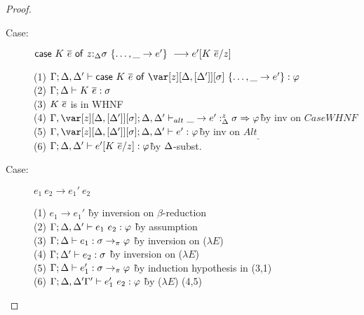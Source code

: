 \begin{proof}
\begin{description}
\begin{tabbing}
\end{tabbing}

\item[Case:]
    $\mathsf{case}~K~\overline{e}~\mathsf{of}~z{:}_{\Delta}\sigma~\{\dots,\_\to e'\}\ \longrightarrow e'[K~\overline{e}/z]$
\begin{tabbing}
    (1) $\G;\D,\D' \vdash \ccase{K~\ov{e}}{\zD~\{\dots,\_ \to e'\}} : \vp$\\
    (2) $\Gamma;\Delta \vdash K~\overline{e} : \sigma$\\
    (3) $K~\overline{e}$ is in WHNF\\
    (4) $\G,\zD;\D,\D' \vdash_{alt} \_ \to e' :^z_{\D} \s \Rightarrow \vp$\`by inv on $CaseWHNF$\\
    (5) $\G,\zD;\D,\D' \vdash e' : \vp$\`by inv on $Alt_\_$\\
    (6) $\Gamma;\Delta,\Delta' \vdash e'[K~\overline{e}/z] : \varphi$\` by $\Delta$-subst.\\
\end{tabbing}

\item[Case:] $e_1~e_2 \longrightarrow e_1'~e_2$
\begin{tabbing}
(1) $e_1 \longrightarrow e_1'$ \` by inversion on $\beta$-reduction \\
(2) $\Gamma;\Delta,\Delta' \vdash e_1~e_2 : \varphi$ \` by assumption \\
(3) $\Gamma; \Delta \vdash e_1 : \sigma \to_\pi \varphi$ \` by inversion on ($\lambda E$) \\
(4) $\Gamma; \Delta' \vdash e_2 : \sigma$ \` by inversion on ($\lambda E$) \\
(5) $\Gamma; \Delta \vdash e_1' : \sigma \to_\pi \varphi$ \` by induction hypothesis in (3,1) \\
(6) $\Gamma; \Delta, \Delta' \Gamma' \vdash e_1'~e_2 : \varphi$ \` by ($\lambda E$) (4,5) \\
\end{tabbing}


\end{description}
\end{proof}
